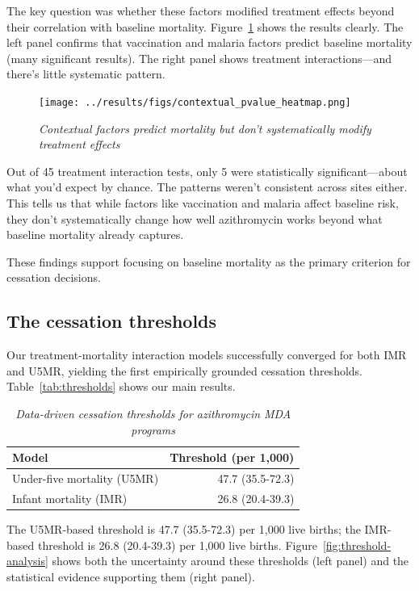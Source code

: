 \documentclass[11pt]{article}\usepackage[]{graphicx}\usepackage[]{xcolor}
\begin{document}
The key question was whether these factors modified treatment effects beyond their correlation with baseline mortality. Figure~\ref{fig:contextual-analysis} shows the results clearly. The left panel confirms that vaccination and malaria factors predict baseline mortality (many significant results). The right panel shows treatment interactions---and there's little systematic pattern.

\begin{figure}[!h]
\centering
\texttt{[image: ../results/figs/contextual\_pvalue\_heatmap.png]}
\caption{\emph{Contextual factors predict mortality but don't systematically modify treatment effects}}
\label{fig:contextual-analysis}
\end{figure}

Out of 45 treatment interaction tests, only 5 were statistically significant---about what you'd expect by chance. The patterns weren't consistent across sites either. This tells us that while factors like vaccination and malaria affect baseline risk, they don't systematically change how well azithromycin works beyond what baseline mortality already captures.

These findings support focusing on baseline mortality as the primary criterion for cessation decisions.

\subsection{The cessation thresholds}

Our treatment-mortality interaction models successfully converged for both IMR and U5MR, yielding the first empirically grounded cessation thresholds. Table~\ref{tab:thresholds} shows our main results.

\begin{table}

\caption{\label{tab:tab:thresholds}\emph{Data-driven cessation thresholds for azithromycin MDA programs}}
\centering
\begin{tabular}[t]{lr}
\toprule
Model & Threshold (per 1,000)\\
\midrule
Under-five mortality (U5MR) & 47.7 (35.5-72.3)\\
Infant mortality (IMR) & 26.8 (20.4-39.3)\\
\bottomrule
\end{tabular}
\end{table}



The U5MR-based threshold is 47.7 (35.5-72.3) per 1,000 live births; the IMR-based threshold is 26.8 (20.4-39.3) per 1,000 live births. Figure~\ref{fig:threshold-analysis} shows both the uncertainty around these thresholds (left panel) and the statistical evidence supporting them (right panel).
\end{document}
